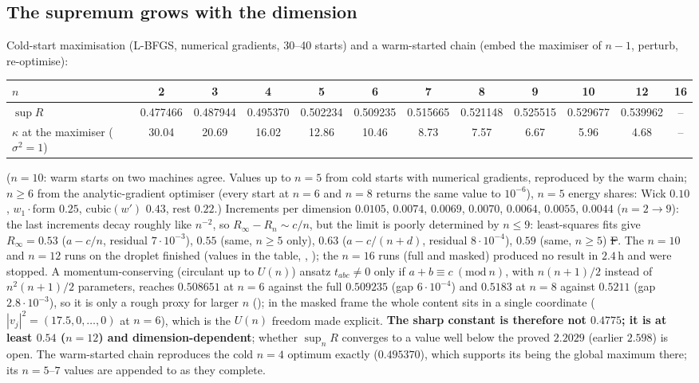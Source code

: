 \subsection{The supremum grows with the dimension}\label{sec:L2growth}
Cold-start maximisation (L-BFGS, numerical gradients, 30--40 starts) and a warm-started chain (embed the maximiser of $n-1$, perturb, re-optimise):
\begin{center}\scriptsize\setlength\tabcolsep{3pt}
\begin{adjustbox}{max width=\linewidth}\begin{tabular}{lccccccccccc}\toprule
$n$ & 2 & 3 & 4 & 5 & 6 & 7 & 8 & 9 & 10 & 12 & 16\\\midrule
$\sup R$ & 0.477466 & 0.487944 & 0.495370 & 0.502234 & 0.509235 & 0.515665 & 0.521148 & 0.525515 & 0.529677 & 0.539962 & --\\
$\kappa$ at the maximiser ($\sigma^2=1$) & 30.04 & 20.69 & 16.02 & 12.86 & 10.46 & 8.73 & 7.57 & 6.67 & 5.96 & 4.68 & --\\\bottomrule
\end{tabular}\end{adjustbox}
\end{center}
($n=10$: warm starts on two machines agree. Values up to $n=5$ from cold starts with numerical gradients, reproduced by the warm chain; $n\ge6$ from the analytic-gradient optimiser  (every start at $n=6$ and $n=8$ returns the same value to $10^{-6}$), $n=5$ energy shares: Wick $0.10$, $w_1\cdot$form $0.25$, cubic$(w')$ $0.43$, rest $0.22$.) Increments per dimension $0.0105$, $0.0074$, $0.0069$, $0.0070$, $0.0064$, $0.0055$, $0.0044$ ($n=2\to9$): the last increments decay roughly like $n^{-2}$, so $R_\infty-R_n\sim c/n$, but the limit is poorly determined by $n\le9$: least-squares fits give $R_\infty=0.53$ ($a-c/n$, residual $7\cdot10^{-3}$), $0.55$ (same, $n\ge5$ only), $0.63$ ($a-c/(n+d)$, residual $8\cdot10^{-4}$), $0.59$ (same, $n\ge5$) \st{F}. The $n=10$ and $n=12$ runs on the droplet finished (values in the table, , ); the $n=16$ runs (full and masked) produced no result in $2.4$\,h and were stopped. A momentum-conserving (circulant up to $U(n)$) ansatz $t_{abc}\ne0$ only if $a+b\equiv c\ (\mathrm{mod}\ n)$, with $n(n+1)/2$ instead of $n^2(n+1)/2$ parameters, reaches $0.508651$ at $n=6$ against the full $0.509235$ (gap $6\cdot10^{-4}$) and $0.5183$ at $n=8$ against $0.5211$ (gap $2.8\cdot10^{-3}$), so it is only a rough proxy for larger $n$ (); in the masked frame the whole content sits in a single coordinate ($|v_j|^2=(17.5,0,\ldots,0)$ at $n=6$), which is the $U(n)$ freedom made explicit. \textbf{The sharp constant is therefore not $0.4775$; it is at least $0.54$ ($n=12$) and dimension-dependent}; whether $\sup_nR$ converges to a value well below the
proved $2.2029$ (earlier $2.598$) is open. The warm-started chain reproduces the cold $n=4$ optimum exactly ($0.495370$), which supports its being the global maximum there; its $n=5$--$7$ values are appended to  as they complete.

